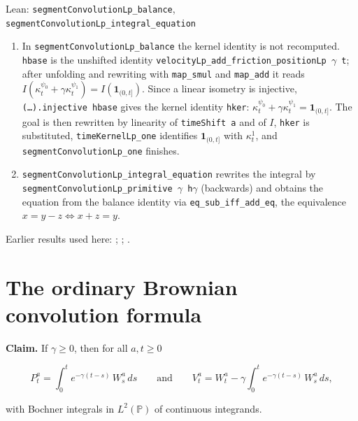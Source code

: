 \documentclass[11pt,a4paper]{article}
\begin{document}
\begin{leanbox}{Lean: \texttt{segmentConvolutionLp\_\allowbreak{}balance}, \texttt{segmentConvolutionLp\_\allowbreak{}integral\_\allowbreak{}equation}}
\begin{enumerate}
\item In \texttt{segment\allowbreak{}Convolution\allowbreak{}Lp\_\allowbreak{}balance} the kernel identity is not recomputed. \texttt{hbase} is the unshifted identity \texttt{velocity\allowbreak{}Lp\_\allowbreak{}add\_\allowbreak{}friction\_\allowbreak{}position\allowbreak{}Lp \ensuremath{\gamma} t}; after unfolding and rewriting with \texttt{map\_\allowbreak{}smul} and \texttt{map\_\allowbreak{}add} it reads \(I(\kappa^{\psi_0}_t+\gamma\kappa^{\psi_1}_t)=I(\mathbf 1_{(0,t]})\). Since a linear isometry is injective, \texttt{(…).\allowbreak{}injective hbase} gives the kernel identity \texttt{hker}: \(\kappa^{\psi_0}_t+\gamma\kappa^{\psi_1}_t=\mathbf 1_{(0,t]}\). The goal is then rewritten by linearity of \texttt{time\allowbreak{}Shift a} and of \(I\), \texttt{hker} is substituted, \texttt{time\allowbreak{}Kernel\allowbreak{}Lp\_\allowbreak{}one} identifies \(\mathbf 1_{(0,t]}\) with \(\kappa^1_t\), and \texttt{segment\allowbreak{}Convolution\allowbreak{}Lp\_\allowbreak{}one} finishes.

\item \texttt{segment\allowbreak{}Convolution\allowbreak{}Lp\_\allowbreak{}integral\_\allowbreak{}equation} rewrites the integral by \texttt{segment\allowbreak{}Convolution\allowbreak{}Lp\_\allowbreak{}primitive \ensuremath{\gamma} h\ensuremath{\gamma}} (backwards) and obtains the equation from the balance identity via \texttt{eq\_\allowbreak{}sub\_\allowbreak{}iff\_\allowbreak{}add\_\allowbreak{}eq}, the equivalence \(x=y-z\iff x+z=y\).

\end{enumerate}
\end{leanbox}


Earlier results used here: \cite[Section~3.6.12]{LangevinLean2026ULASC}; \cite[Section~3.8.5]{LangevinLean2026ULASC}; \cite[Section~3.8.9]{LangevinLean2026ULASC}.

\section{\texorpdfstring{The ordinary Brownian convolution formula}{The ordinary Brownian convolution formula}}


\textbf{Claim.} If \(\gamma\ge0\), then for all \(a,t\ge0\)


\[P^a_t=\int_0^te^{-\gamma(t-s)}\,W^a_s\,ds\qquad\text{and}\qquad V^a_t=W^a_t-\gamma\int_0^te^{-\gamma(t-s)}\,W^a_s\,ds,\]


with Bochner integrals in \(L^2(\mathbb P)\) of continuous integrands.
\end{document}
